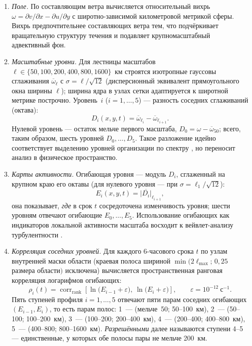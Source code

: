 \documentclass[11pt,a4paper]{article}
\begin{document}
\begin{enumerate}
\item \emph{Поле.} По составляющим ветра вычисляется относительный вихрь $\omega=\partial v/\partial x-\partial u/\partial y$ с широтно-зависимой километровой метрикой сферы. Вихрь предпочтительнее составляющих ветра тем, что подчёркивает вращательную структуру течения и подавляет крупномасштабный адвективный фон.
\item \emph{Масштабные уровни.} Для лестницы масштабов $\ell\in\{50,100,200,400,800,1600\}$~км строятся изотропные гауссовы сглаживания $\overline{\omega}_{\ell}$ с $\sigma=\ell/\sqrt{12}$ (дисперсионный эквивалент прямоугольного окна ширины $\ell$); ширина ядра в узлах сетки адаптируется к широтной метрике построчно. Уровень~$i$ ($i=1,\dots,5$) --- разность соседних сглаживаний (октава):
\begin{equation}
D_i(x,y,t)=\overline{\omega}_{\ell_i}-\overline{\omega}_{\ell_{i+1}}.
\end{equation}
Нулевой уровень --- остаток мельче первого масштаба, $D_0=\omega-\overline{\omega}_{50}$; всего, таким образом, шесть уровней $D_0,\dots,D_5$. Такое разложение идейно соответствует выделению уровней организации по спектру \cite{Krenke2019}, но переносит анализ в физическое пространство.
\item \emph{Карты активности.} Огибающая уровня --- модуль $D_i$, сглаженный на крупном краю его октавы (для нулевого уровня --- при $\sigma=\ell_1/\sqrt{12}$):
\begin{equation}
E_i(x,y,t)=\overline{\lvert D_i\rvert}_{\ell_{i+1}},
\end{equation}
она показывает, \emph{где} в срок $t$ сосредоточена изменчивость уровня; шести уровням отвечают огибающие $E_0,\dots,E_5$. Использование огибающих как индикаторов локальной активности масштаба восходит к вейвлет-анализу турбулентности \cite{Farge1992}.
\item \emph{Корреляция соседних уровней.} Для каждого 6-часового срока $t$ по узлам внутренней маски области (краевая полоса шириной $\min(2\ell_{\max};\,0{,}25$ размера области$)$ исключена) вычисляется пространственная ранговая корреляция логарифмов огибающих:
\begin{equation}
\rho_i(t)=\operatorname{corr}_{\mathrm{rank}}\!\left[\ln\!\big(E_{i-1}+\varepsilon\big),\ \ln\!\big(E_{i}+\varepsilon\big)\right],
\qquad \varepsilon=10^{-12}\ \text{с}^{-1}.
\label{eq:rho}
\end{equation}
Пять ступеней профиля $i=1,\dots,5$ отвечают пяти парам соседних огибающих $(E_{i-1},E_i)$, то есть парам полос: 1~--- (мельче~50; 50--100~км), 2~--- (50--100; 100--200~км), 3~--- (100--200; 200--400~км), 4~--- (200--400; 400--800~км), 5~--- (400--800; 800--1600~км). \emph{Разрешёнными} далее называются ступени 4--5 --- единственные, у которых обе полосы пары не мельче 200~км.

\end{enumerate}
\end{document}
